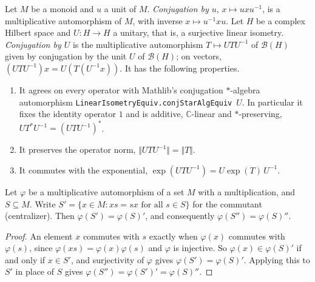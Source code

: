 \begin{definition}
    \label{def:unitary-conjugation}
    \leanok
    Let $M$ be a monoid and $u$ a unit of $M$. \emph{Conjugation by $u$}, $x \mapsto u x u^{-1}$, is a multiplicative automorphism of $M$, with inverse $x \mapsto u^{-1} x u$. Let $H$ be a complex Hilbert space and $U : H \to H$ a unitary, that is, a surjective linear isometry. \emph{Conjugation by $U$} is the multiplicative automorphism $T \mapsto U T U^{-1}$ of $\mathcal{B}(H)$ given by conjugation by the unit $U$ of $\mathcal{B}(H)$; on vectors, $(U T U^{-1})x = U(T(U^{-1}x))$. It has the following properties.
    \begin{enumerate}
        \item It agrees on every operator with Mathlib's conjugation $*$-algebra automorphism \texttt{LinearIsometryEquiv.conjStarAlgEquiv}~$U$. In particular it fixes the identity operator $1$ and is additive, $\mathbb{C}$-linear and $*$-preserving, $U T^* U^{-1} = (U T U^{-1})^*$.
        \item It preserves the operator norm, $\Vert U T U^{-1} \Vert = \Vert T \Vert$.
        \item It commutes with the exponential, $\exp(U T U^{-1}) = U \exp(T)\, U^{-1}$.
    \end{enumerate}
\end{definition}

\begin{lemma}
    \label{lmm:automorphism-commutant}
    \leanok
    Let $\varphi$ be a multiplicative automorphism of a set $M$ with a multiplication, and $S \subseteq M$. Write $S' = \{x \in M : xs = sx \text{ for all } s \in S\}$ for the commutant (centralizer). Then $\varphi(S') = \varphi(S)'$, and consequently $\varphi(S'') = \varphi(S)''$.
\end{lemma}
\begin{proof}
    \leanok
    An element $x$ commutes with $s$ exactly when $\varphi(x)$ commutes with $\varphi(s)$, since $\varphi(xs) = \varphi(x)\varphi(s)$ and $\varphi$ is injective. So $\varphi(x) \in \varphi(S)'$ if and only if $x \in S'$, and surjectivity of $\varphi$ gives $\varphi(S') = \varphi(S)'$. Applying this to $S'$ in place of $S$ gives $\varphi(S'') = \varphi(S')' = \varphi(S)''$.
\end{proof}

